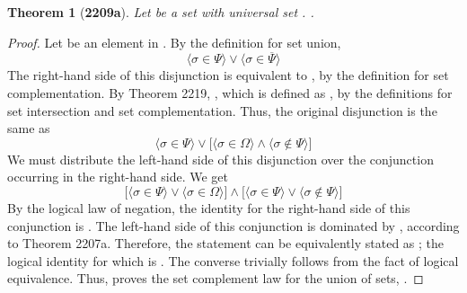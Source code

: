 \documentclass[preview]{standalone}
\newtheorem*{theorem*}{Theorem}
\begin{document}
\begin{theorem*}[\textbf{2209a}] \color{black}
    Let \bm{$\Psi$} be a set with universal set \bm{$\Omega$}.
    \bm{$\Psi \cup \overline{\Psi} = \Omega$}.
\end{theorem*}
\begin{proof} \color{black}
    Let \bm{$\sigma$} be an element in \bm{$\Psi \cup \overline{\Psi}$}. 
    By the definition for set union,  
    \begin{equation*}
        \Big \langle \sigma \in \Psi \Big \rangle 
            \lor 
        \Big \langle \sigma \in \overline{\Psi} \Big \rangle
    \end{equation*}
    The right-hand side of this disjunction is equivalent to \bm{$\sigma \in \Omega - \Psi$}, 
    by the definition for set complementation. 
    By Theorem 2219, \bm{$\sigma \in \Omega \cap \overline{\Psi}$}, 
    which is defined as 
    \bm{$\big \langle \sigma \in \Omega \big \rangle 
        \land 
    \big \langle \sigma \notin \Psi \big \rangle$},
    by the definitions for set intersection and set complementation. 
    Thus, the original disjunction is the same as 
    \begin{equation*}
        \Big \langle \sigma \in \Psi \Big \rangle 
            \lor 
        \Bigg[
            \Big \langle \sigma \in \Omega \Big \rangle 
                \land 
            \Big \langle \sigma \notin \Psi \Big \rangle
        \Bigg]
    \end{equation*}
    We must distribute the left-hand side of this disjunction over the conjunction occurring in the right-hand side. 
    We get 
    \begin{equation*}
        \Bigg[
            \Big \langle \sigma \in \Psi \Big \rangle 
                \lor 
            \Big \langle \sigma \in \Omega \Big \rangle
        \Bigg] 
            \land 
        \Bigg[
            \Big \langle \sigma \in \Psi \Big \rangle 
                \lor 
            \Big \langle \sigma \notin \Psi \Big \rangle
        \Bigg]
    \end{equation*}
    By the logical law of negation, 
    the identity for the right-hand side of this conjunction is \bm{$\top$}. 
    The left-hand side of this conjunction is dominated by \bm{$\Omega$}, 
    according to Theorem 2207a. 
    Therefore, 
    the statement \bm{$\sigma \in \Psi \cup \overline{\Psi}$} can be equivalently stated as 
    \bm{$\big \langle \sigma \in \Omega \big \rangle \land \top$}; 
    the logical identity for which is \bm{$\sigma \in \Omega$}. 
    The converse trivially follows from the fact of logical equivalence. 
    Thus, 
    proves the set complement law for the union of sets, 
    \bm{$\Psi \cup \overline{\Psi} = \Omega$}.
\color{lightgray} \end{proof}
\end{document}
